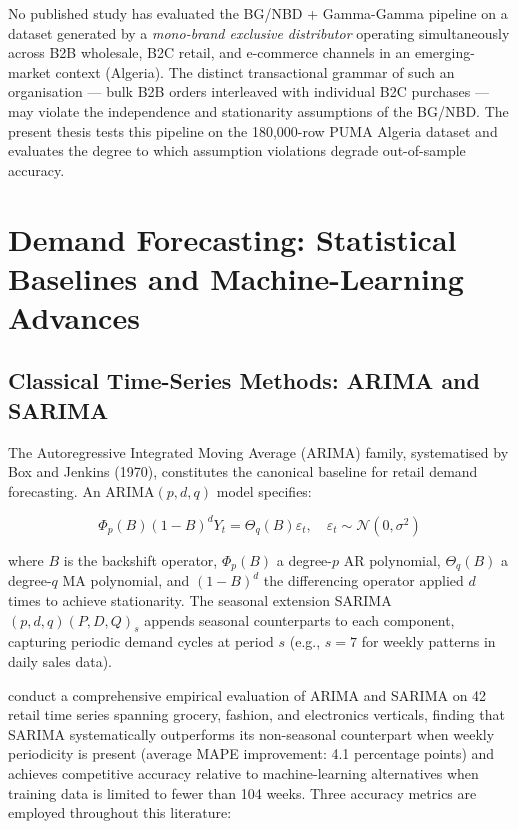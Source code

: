 \begin{tcolorbox}[colback=gray!10, colframe=black, title=\textbf{Literature Gap — CLV Modelling}, fonttitle=\bfseries]
No published study has evaluated the BG/NBD + Gamma-Gamma pipeline on a dataset generated by a \textit{mono-brand exclusive distributor} operating simultaneously across B2B wholesale, B2C retail, and e-commerce channels in an emerging-market context (Algeria). The distinct transactional grammar of such an organisation — bulk B2B orders interleaved with individual B2C purchases — may violate the independence and stationarity assumptions of the BG/NBD. The present thesis tests this pipeline on the 180,000-row PUMA Algeria dataset and evaluates the degree to which assumption violations degrade out-of-sample accuracy.
\end{tcolorbox}

\section{Demand Forecasting: Statistical Baselines and Machine-Learning Advances}

\subsection{Classical Time-Series Methods: ARIMA and SARIMA}

The Autoregressive Integrated Moving Average (ARIMA) family, systematised by Box and Jenkins (1970), constitutes the canonical baseline for retail demand forecasting. An ARIMA$(p, d, q)$ model specifies:

\begin{equation}
    \Phi_p(B)(1 - B)^d Y_t = \Theta_q(B) \varepsilon_t, \quad \varepsilon_t \sim \mathcal{N}(0, \sigma^2)
    \label{eq:arima}
\end{equation}

where $B$ is the backshift operator, $\Phi_p(B)$ a degree-$p$ AR polynomial, $\Theta_q(B)$ a degree-$q$ MA polynomial, and $(1-B)^d$ the differencing operator applied $d$ times to achieve stationarity. The seasonal extension SARIMA$(p,d,q)(P,D,Q)_s$ appends seasonal counterparts to each component, capturing periodic demand cycles at period $s$ (e.g., $s=7$ for weekly patterns in daily sales data).

\cite{MethodsSalesForecasting2022} conduct a comprehensive empirical evaluation of ARIMA and SARIMA on 42 retail time series spanning grocery, fashion, and electronics verticals, finding that SARIMA systematically outperforms its non-seasonal counterpart when weekly periodicity is present (average MAPE improvement: 4.1 percentage points) and achieves competitive accuracy relative to machine-learning alternatives when training data is limited to fewer than 104 weeks. Three accuracy metrics are employed throughout this literature:

